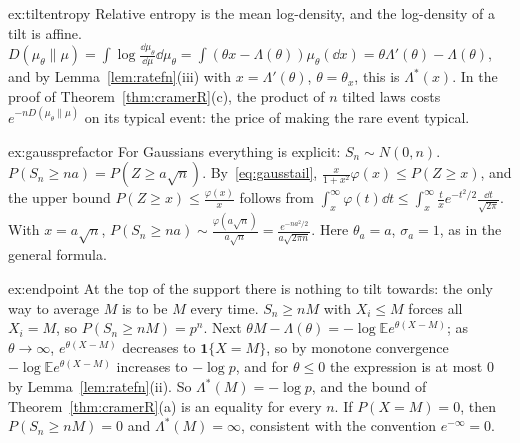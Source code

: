 \begin{solution}{ex:tiltentropy}
\idea Relative entropy is the mean log-density, and the log-density of a tilt is affine.
\writeup $D(\mu_\theta\|\mu)=\int\log\frac{\dd\mu_\theta}{\dd\mu}\dd\mu_\theta=\int(\theta x-\Lambda(\theta))\mu_\theta(\dd x)=\theta\Lambda'(\theta)-\Lambda(\theta)$, and by Lemma~\ref{lem:ratefn}(iii) with
$x=\Lambda'(\theta)$, $\theta=\theta_x$, this is $\Lambda^*(x)$. In the proof of Theorem~\ref{thm:cramerR}(c), the product of $n$ tilted laws costs $e^{-nD(\mu_\theta\|\mu)}$ on its typical
event: the price of making the rare event typical.
\end{solution}

\begin{solution}{ex:gaussprefactor}
\idea For Gaussians everything is explicit: $S_n\sim N(0,n)$.
\writeup $P(S_n\ge na)=P(Z\ge a\sqrt n)$. By~\eqref{eq:gausstail}, $\frac{x}{1+x^2}\varphi(x)\le P(Z\ge x)$, and the upper bound $P(Z\ge x)\le\frac{\varphi(x)}x$ follows from
$\int_x^\infty\varphi(t)\dd t\le\int_x^\infty\frac txe^{-t^2/2}\frac{\dd t}{\sqrt{2\pi}}$. With $x=a\sqrt n$, $P(S_n\ge na)\sim\frac{\varphi(a\sqrt n)}{a\sqrt n}=\frac{e^{-na^2/2}}{a\sqrt{2\pi n}}$. Here $\theta_a=a$,
$\sigma_a=1$, as in the general formula.
\end{solution}

\begin{solution}{ex:endpoint}
\idea At the top of the support there is nothing to tilt towards: the only way to average $M$ is to be $M$ every time.
\writeup $S_n\ge nM$ with $X_i\le M$ forces all $X_i=M$, so $P(S_n\ge nM)=p^n$. Next $\theta M-\Lambda(\theta)=-\log\mathbb Ee^{\theta(X-M)}$; as $\theta\to\infty$, $e^{\theta(X-M)}$ decreases to
$\mathbf 1\{X=M\}$, so by monotone convergence $-\log\mathbb Ee^{\theta(X-M)}$ increases to $-\log p$, and for $\theta\le0$ the expression is at most $0$ by Lemma~\ref{lem:ratefn}(ii). So
$\Lambda^*(M)=-\log p$, and the bound of Theorem~\ref{thm:cramerR}(a) is an equality for every $n$. If $P(X=M)=0$, then $P(S_n\ge nM)=0$ and $\Lambda^*(M)=\infty$, consistent with the convention $e^{-\infty}=0$.
\end{solution}

